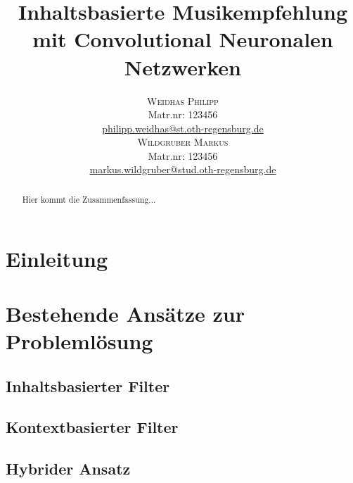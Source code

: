 \documentclass[twosided,a4,10pt]{article}
\title{\vspace{-5mm}%
	\fontsize{20pt}{10pt}\selectfont
	\textbf{Inhaltsbasierte Musikempfehlung mit Convolutional Neuronalen Netzwerken}
	}
\author{
	\large
       \begin{minipage}[t]{0.5\linewidth}
         \begin{center}
           	\textsc{Weidhas Philipp}\\[2mm]
                 \normalsize	Matr.nr: 123456\\
                 \normalsize
                 \href{mailto:philipp.weidhas@st.oth-regensburg.de}
                 {philipp.weidhas@st.oth-regensburg.de}      
         \end{center}
       \end{minipage}        
       \begin{minipage}[t]{0.5\linewidth}
         \begin{center}
           	\textsc{Wildgruber Markus}\\[2mm]
                 \normalsize	Matr.nr: 123456\\
                 \normalsize
                 \href{mailto:markus.wildgruber@stud.oth-regensburg.de}
                 {markus.wildgruber@stud.oth-regensburg.de}      
         \end{center}
       \end{minipage}
     }
\begin{document}
\maketitle
\thispagestyle{fancy}

	

\begin{multicols}{2}

\begin{abstract}
\noindent Hier kommt die Zusammenfassung...
\end{abstract}


\section{Einleitung}

\section{Bestehende Ansätze zur Problemlösung}

\subsection{Inhaltsbasierter Filter}

\subsection{Kontextbasierter Filter}

\subsection{Hybrider Ansatz}


\end{multicols}
\end{document}
